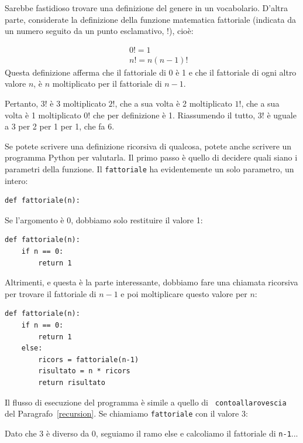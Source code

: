 \documentclass[10pt]{book}
\begin{document}
Sarebbe fastidioso trovare una definizione del genere in un vocabolario.
D'altra parte, considerate la definizione della funzione matematica    fattoriale (indicata da un numero seguito da un punto esclamativo, $!$), cioè:

%
\begin{eqnarray*}
&&  0! = 1 \\
&&  n! = n (n-1)!
\end{eqnarray*}
%
Questa definizione afferma che il fattoriale di 0 è 1 e che il fattoriale di ogni altro valore $n$, è $n$ moltiplicato per il fattoriale di $n-1$.

Pertanto, $3!$ è 3 moltiplicato $2!$, che a sua volta è 2 moltiplicato $1!$, che
   a sua volta è 1 moltiplicato $0!$ che per definizione è 1. Riassumendo il tutto, $3!$ è uguale a 3 per 2 per 1 per 1, che fa 6.

Se potete scrivere una definizione ricorsiva di qualcosa, potete anche scrivere un programma Python per valutarla. Il primo passo è quello di decidere
quali siano i parametri della funzione. Il {\tt fattoriale} ha evidentemente un solo parametro, un intero:

\begin{verbatim}
def fattoriale(n):
\end{verbatim}
%
Se l'argomento è 0, dobbiamo solo restituire il valore 1:

\begin{verbatim}
def fattoriale(n):
    if n == 0:
        return 1
\end{verbatim}
%
Altrimenti, e questa è la parte interessante, dobbiamo fare una chiamata ricorsiva per trovare il fattoriale di $n-1$ e poi moltiplicare questo valore per $n$:

\begin{verbatim}
def fattoriale(n):
    if n == 0:
        return 1
    else:
        ricors = fattoriale(n-1)
        risultato = n * ricors
        return risultato
\end{verbatim}
%
Il flusso di esecuzione del programma è simile a quello di {\tt
contoallarovescia} del Paragrafo~\ref{recursion}. Se chiamiamo {\tt fattoriale}
con il valore 3:

Dato che 3 è diverso da 0, seguiamo il ramo else e calcoliamo il fattoriale
   di {\tt n-1}...
\end{document}
